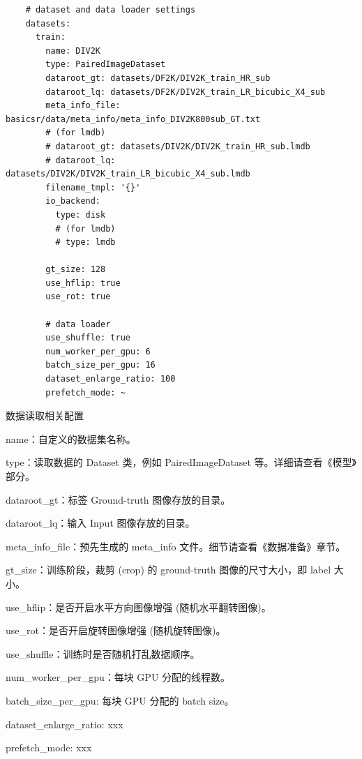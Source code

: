 \documentclass[../main.tex]{subfiles}
\begin{document}
	\begin{verbatim}
    # dataset and data loader settings
    datasets:
      train:
        name: DIV2K
        type: PairedImageDataset
        dataroot_gt: datasets/DF2K/DIV2K_train_HR_sub
        dataroot_lq: datasets/DF2K/DIV2K_train_LR_bicubic_X4_sub
        meta_info_file: basicsr/data/meta_info/meta_info_DIV2K800sub_GT.txt
        # (for lmdb)
        # dataroot_gt: datasets/DIV2K/DIV2K_train_HR_sub.lmdb
        # dataroot_lq: datasets/DIV2K/DIV2K_train_LR_bicubic_X4_sub.lmdb
        filename_tmpl: '{}'
        io_backend:
          type: disk
          # (for lmdb)
          # type: lmdb
        
        gt_size: 128
        use_hflip: true
        use_rot: true
    
        # data loader
        use_shuffle: true
        num_worker_per_gpu: 6
        batch_size_per_gpu: 16
        dataset_enlarge_ratio: 100
        prefetch_mode: ~
	\end{verbatim}
	\begin{exampleBox}[righthand ratio=0.00, sidebyside, sidebyside align=center, lower separated=false]{数据读取相关配置}
	
	name：自定义的数据集名称。
	
	type：读取数据的 Dataset 类，例如 PairedImageDataset 等。详细请查看《模型》部分。
	
	dataroot\_gt：标签 Ground-truth 图像存放的目录。
	
	dataroot\_lq：输入 Input 图像存放的目录。
	
	meta\_info\_file：预先生成的 meta\_info 文件。细节请查看《数据准备》章节。
	
	gt\_size：训练阶段，裁剪 (crop) 的 ground-truth 图像的尺寸大小，即 label 大小。
	
	use\_hflip：是否开启水平方向图像增强 (随机水平翻转图像)。
	
	use\_rot：是否开启旋转图像增强 (随机旋转图像)。
	
	use\_shuffle：训练时是否随机打乱数据顺序。
	
	num\_worker\_per\_gpu：每块 GPU 分配的线程数。
	
	batch\_size\_per\_gpu: 每块 GPU 分配的 batch size。
	
	dataset\_enlarge\_ratio: xxx
    
    prefetch\_mode: xxx
    
    \end{exampleBox}
    
\end{document}
